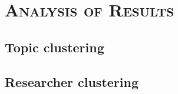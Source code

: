 \chapter{\textsc{Analysis of Results}}
\label{chapterlabel6}

\section{Topic clustering}

\section{Researcher clustering}